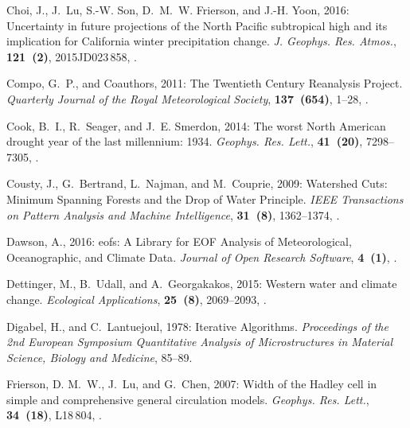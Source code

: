\documentclass[final, double]{ua-thesis}
\begin{document}
\begin{thebibliography}{}
Choi, J., J.~Lu, S.-W. Son, D.~M.~W. Frierson, and J.-H. Yoon, 2016:
  Uncertainty in future projections of the {North} {Pacific} subtropical high
  and its implication for {California} winter precipitation change. \textit{J.
  Geophys. Res. Atmos.}, \textbf{121~(2)}, 2015JD023\,858,
  .

Compo, G.~P., and Coauthors, 2011: The {Twentieth} {Century} {Reanalysis}
  {Project}. \textit{Quarterly Journal of the Royal Meteorological Society},
  \textbf{137~(654)}, 1--28, .

Cook, B.~I., R.~Seager, and J.~E. Smerdon, 2014: The worst {North} {American}
  drought year of the last millennium: 1934. \textit{Geophys. Res. Lett.},
  \textbf{41~(20)}, 7298--7305, .

Cousty, J., G.~Bertrand, L.~Najman, and M.~Couprie, 2009: Watershed {Cuts}:
  {Minimum} {Spanning} {Forests} and the {Drop} of {Water} {Principle}.
  \textit{IEEE Transactions on Pattern Analysis and Machine Intelligence},
  \textbf{31~(8)}, 1362--1374, .

Dawson, A., 2016: eofs: {A} {Library} for {EOF} {Analysis} of {Meteorological},
  {Oceanographic}, and {Climate} {Data}. \textit{Journal of Open Research
  Software}, \textbf{4~(1)}, .

Dettinger, M., B.~Udall, and A.~Georgakakos, 2015: Western water and climate
  change. \textit{Ecological Applications}, \textbf{25~(8)}, 2069--2093,
  .

Digabel, H., and C.~Lantuejoul, 1978: Iterative {Algorithms}.
  \textit{Proceedings of the 2nd European Symposium Quantitative Analysis of
  Microstructures in Material Science, Biology and Medicine}, 85--89.

Frierson, D. M.~W., J.~Lu, and G.~Chen, 2007: Width of the {Hadley} cell in
  simple and comprehensive general circulation models. \textit{Geophys. Res.
  Lett.}, \textbf{34~(18)}, L18\,804, .


\end{thebibliography}
\end{document}
